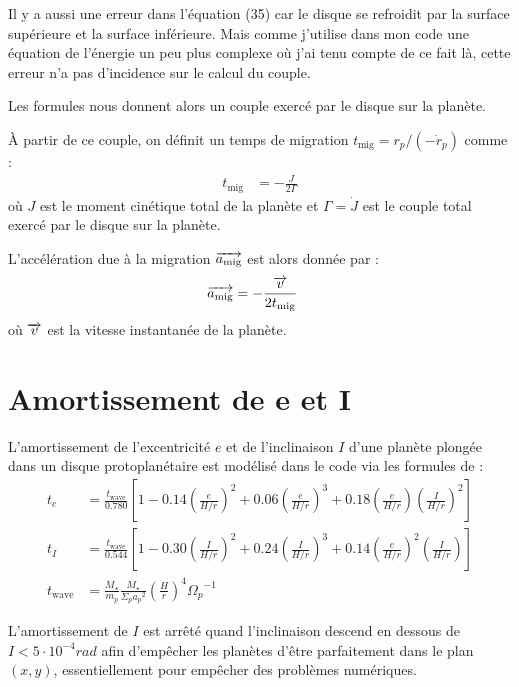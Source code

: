 Il y a aussi une erreur dans l'équation (35) car le disque se refroidit par la surface supérieure et la surface inférieure. Mais comme j'utilise dans mon code une équation de l'énergie  un peu plus complexe où j'ai tenu compte de ce fait là, cette erreur n'a pas d'incidence sur le calcul du couple.

Les formules nous donnent alors un couple exercé par le disque sur la planète. 

À partir de ce couple, on définit un temps de migration $t_\text{mig}=r_p / (-\dot{r}_p)$ comme \citep[eq. 
(69)]{tanaka2002three}: 
\begin{align}
t_\text{mig} &= -\frac{J}{2\Gamma}
\end{align}
où $J$ est le moment cinétique total de la planète et $\Gamma=\dot{J}$ est le couple total exercé par le disque sur la planète.

L'accélération due à la migration ${\overrightarrow{a_\text{mig}}}$ est alors donnée par :
\begin{align}
{\overrightarrow{a_\text{mig}}} &= -\frac{{\overrightarrow{v}}}{2 t_\text{mig}}
\end{align}
où ${\overrightarrow{v}}$ est la vitesse instantanée de la planète.

\section{Amortissement de e et I}
L'amortissement de l'excentricité $e$ et de l'inclinaison $I$ d'une planète plongée dans un disque protoplanétaire est modélisé
dans le code via les formules de \cite[eq. (9), (11) et (12)]{cresswell2008three} : 
\begin{subequations}
\begin{align}
t_e &= \frac{t_\text{wave}}{0.780}\left[1-0.14\left(\frac{e}{H/r}\right)^2 + 0.06 \left(\frac{e}{H/r}\right)^3 + 0.18\left(\frac{e}{H/r}\right)\left(\frac{I}{H/r}\right)^2\right]\\
t_I &= \frac{t_\text{wave}}{0.544}\left[1-0.30\left(\frac{I}{H/r}\right)^2 + 0.24 \left(\frac{I}{H/r}\right)^3 + 0.14\left(\frac{e}{H/r}\right)^2\left(\frac{I}{H/r}\right)\right]\\
t_\text{wave} &= \frac{M_\star}{m_p}\frac{M_\star}{\Sigma_p {a_p}^2}\left(\frac{H}{r}\right)^4{\Omega_p}^{-1}
\end{align}
\end{subequations}

L'amortissement de $I$ est arrêté quand l'inclinaison descend en dessous de $I<5\cdot 10^{-4}\unit{rad}$ afin d'empêcher les planètes d'être parfaitement dans le plan $(x,y)$, essentiellement pour empêcher des problèmes numériques.

